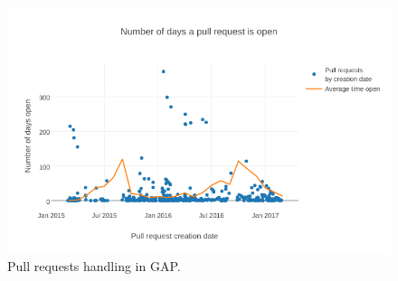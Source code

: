 \documentclass{deliverablereport}
\begin{document}
\begin{figure}[ht]
  \includegraphics[width=\textwidth]{gap-pullrequests}
    \caption{Pull requests handling in GAP.\label{wp7:fig:GAPpulls}}
\end{figure}


\printbibliography
\end{document}

